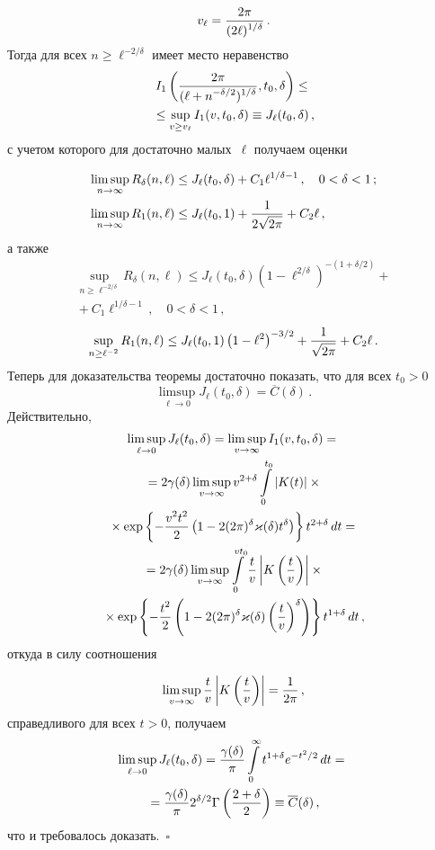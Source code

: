 \begin{multicols}{2}
\vspace*{-2pt}

\noindent
$$
v_\ell=\displaystyle\frac{\displaystyle 2\pi\mathstrut}{\displaystyle (2\ell)^{1/\delta}\mathstrut}\,.
$$
Тогда для всех $n\ge\ell^{-2/\delta}$ имеет место неравенство
\begin{multline*}
I_1\left(\displaystyle\frac{\displaystyle 2\pi\mathstrut}{\displaystyle (\ell+n^{-\delta/2})^{1/\delta}\mathstrut},t_0,\delta\right)\le{}\\
{}\le
\sup_{v\ge v_\ell}I_1(v,t_0,\delta)\equiv J_\ell(t_0,\delta)\,,
\end{multline*}
с учетом которого для достаточно малых~$\ell$ получаем оценки

\noindent
\begin{align*}
\limsup_{n\to\infty}R_\delta(n,\ell)&\le J_\ell(t_0,\delta)
+C_1\ell^{1/\delta-1}\,,\quad 0<\delta<1\,;\\
\limsup_{n\to\infty}R_1(n,\ell)&\le J_\ell(t_0,1)
+\displaystyle\frac{\displaystyle 1\mathstrut}{\displaystyle 2\sqrt{2\pi}\mathstrut}+ C_2\ell\,,
\end{align*}
а также
\begin{multline*}
\sup_{n\ge\ell^{-2/\delta}}R_\delta(n,\ell)\le
J_\ell(t_0,\delta)\left(1-\ell^{2/\delta}\right)^{-(1+\delta/2)}+{}\\
{}+
C_1\ell^{1/\delta-1}\,,\quad 0<\delta<1\,,
\end{multline*}
$$
\sup_{n\ge\ell^{-2}}R_1(n,\ell)\le
J_\ell(t_0,1)\left(1-\ell^2\right)^{-3/2} +\displaystyle\frac{\displaystyle 1\mathstrut}{\displaystyle \sqrt{2\pi}\mathstrut}+
C_2\ell\,.
$$
Теперь для доказательства теоремы достаточно показать, что для всех
$t_0>0$
$$
\limsup_{\ell\to0}J_\ell(t_0,\delta)=\overline C(\delta)\,.
$$
Действительно,
\begin{multline*}
\limsup_{\ell\to 0}J_\ell(t_0,\delta)= \limsup_{v\to\infty}
I_1(v,t_0,\delta)={}
\\
{}
=2\gamma(\delta)\limsup_{v\to\infty}v^{2+\delta}\int\limits_0^{t_0}|K(t)|\times{}\\
{}\times
\exp\left\{-\displaystyle\frac{\displaystyle v^2t^2\mathstrut}{\displaystyle 2\mathstrut} \left(1-2(2\pi)^\delta\varkappa(\delta)t^{\delta}
\right)\right\} t^{2+\delta}\,dt={}\\
{}
=2\gamma(\delta)\limsup_{v\to\infty}\int\limits_0^{vt_0}
\displaystyle\frac{\displaystyle t\mathstrut}{\displaystyle v\mathstrut}\left|K\left(\displaystyle\frac{\displaystyle t\mathstrut}{\displaystyle v\mathstrut}\right)\right| \times{}\\
{}\times
\exp\left\{-\displaystyle\frac{\displaystyle t^2\mathstrut}{\displaystyle 2\mathstrut}
\left(1-2(2\pi)^\delta\varkappa(\delta)\left(\displaystyle\frac{\displaystyle t\mathstrut}{\displaystyle v\mathstrut}\right)^{\delta}
\right)\right\} t^{1+\delta}\,dt\,,
\end{multline*}
откуда в силу соотношения
\columnbreak

\noindent
$$
\limsup_{v\to\infty}
\displaystyle\frac{\displaystyle t\mathstrut}{\displaystyle v\mathstrut}\left|K\left(\displaystyle\frac{\displaystyle t\mathstrut}{\displaystyle v\mathstrut}\right)\right|=\displaystyle\frac{\displaystyle 1\mathstrut}{\displaystyle 2\pi\mathstrut}\,,
$$
справедливого для всех $t>0$, получаем
\begin{multline*}
\limsup_{\ell\to0}J_\ell(t_0,\delta)= \displaystyle\frac{\displaystyle \gamma(\delta)\mathstrut}{\displaystyle \pi\mathstrut}
\int\limits_0^{\infty}t^{1+\delta}e^{-{t^2}/2}\,dt={}\\
{}=
\displaystyle\frac{\displaystyle \gamma(\delta)\mathstrut}{\displaystyle \pi\mathstrut} 2^{\delta/2}\Gamma\left(\displaystyle\frac{\displaystyle 2+\delta\mathstrut}{\displaystyle 2\mathstrut}\right)\equiv
\overline{C}(\delta)\,,
\end{multline*}
что и требовалось доказать.~$\square$


\end{multicols}
